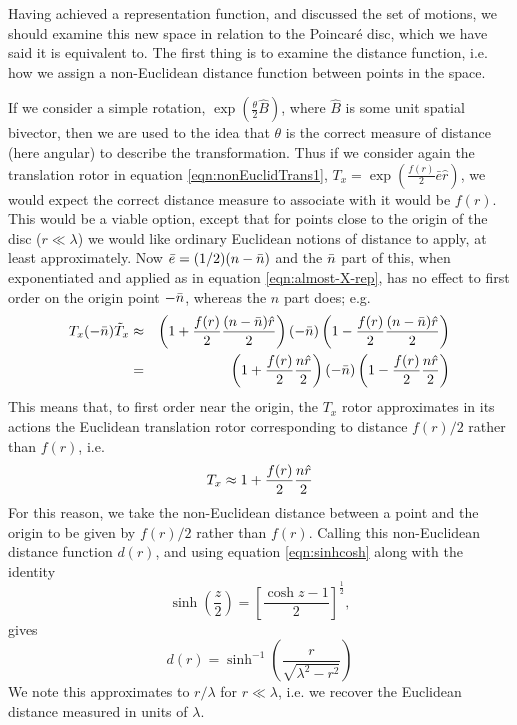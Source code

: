 Having achieved a representation function, and discussed
the set of motions, we should examine this new space in
relation to the Poincar\'e disc, which we have said it is
equivalent to. The first thing is to examine the distance
function, i.e. how we assign a non-Euclidean distance
function between points in the space.

If we consider a simple rotation,
$\exp\left(\frac{\theta}{2}\hat{B}\right)$, where $\hat{B}$ is some unit
spatial bivector, then we are used to the idea that
$\theta$ is the correct measure of distance (here
angular) to describe the transformation. Thus if we
consider again the translation rotor in
equation \ref{eqn:nonEuclidTrans1}, $T_x = \exp\left(\frac{f(r)}{2}\bar{e}\hat{r}\right)$,
%
%
we would expect the correct distance
measure to associate with it would be $f(r)$. This would be a
viable option, except that for points close to the origin of the
disc ($r\ll\lambda$) we would like ordinary Euclidean notions of
distance to apply, at least approximately. Now $\bar{e} =
(1/2)(n-\bar{n})$ and the $\bar{n}$ part of this, when exponentiated and
applied as in equation \ref{eqn:almost-X-rep}, has no effect to
first order on the origin point $-\bar{n}$, whereas the $n$ part does;
e.g.
%
\begin{eqnarray}
T_x(-\bar{n})\tilde{T}_x & \approx  & \left(1+
\frac{f(r)}{2}\frac{(n-\bar{n})\hat{r}}{2}\right)(-\bar{n})\left(1-
\frac{f(r)}{2}\frac{(n-\bar{n})\hat{r}}{2}\right)   \nonumber \\
 & =  &
\left(1+
\frac{f(r)}{2}\frac{n\hat{r}}{2}\right)(-\bar{n})\left(1 -
\frac{f(r)}{2}\frac{n\hat{r}}{2}\right)
\end{eqnarray}
%
This means that, to first order near the origin, the
$T_x$ rotor approximates in its actions the Euclidean
translation rotor corresponding to distance $f(r)/2$
rather than $f(r)$, i.e.
%
\begin{equation}
T_x \approx 1 + \frac{f(r)}{2}\frac{n \hat{r}}{2}
\end{equation}
%
For this reason, we take the non-Euclidean distance
between a point and the origin to be given by $f(r)/2$
rather than $f(r)$. Calling this non-Euclidean distance
function $d(r)$, and using equation
\ref{eqn:sinhcosh} along with the identity 
\[\sinh\left(\frac{z}{2}\right) =
\left[\frac{\cosh z - 1}{2}\right]^{\frac{1}{2}},\]
gives
%
\begin{equation} \label{eqn:defines-dofr}
d(r) =
\sinh^{-1}\left(\frac{r}{\sqrt{\lambda^2-r^2}}\right)
\end{equation}
%
We note this approximates to $r/\lambda$ for
$r\ll\lambda$, i.e. we recover the Euclidean distance
measured in units of $\lambda$.

